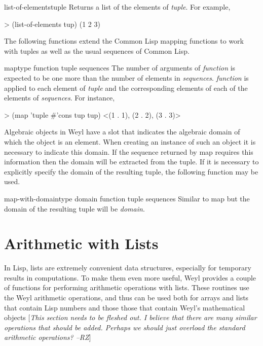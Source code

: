\begin{methoddef}{list-of-elements}{tuple}
Returns a list of the elements of {\em tuple}.  For example,
\begin{code}
> (list-of-elements tup)
(1 2 3)
\end{code}
\end{methoddef}
  
The following functions extend the Common Lisp mapping functions to
work with tuples as well as the usual sequences of Common Lisp.
  
\begin{methoddef}{map}{type function tuple \rest sequences}
The number of arguments of {\em function} is
expected to be one more than the number of elements
in {\em sequences}.  {\em function} is applied to each element of
{\em tuple} and the corresponding elements of each of the
elements of {\em sequences}. For instance,
\begin{code}
> (map 'tuple #'cons tup tup)
<(1 . 1), (2 . 2), (3 . 3)>
\end{code}
\end{methoddef}

Algebraic objects in Weyl have a slot that indicates the algebraic
domain of which the object is an element.  When creating an instance
of such an object it is necessary to indicate this domain.  If the
sequence returned by {\sf map} requires this information then the
domain will be extracted from the tuple.  If it is necessary to
explicitly specify the domain of the resulting tuple, the following
function may be used.
  
\begin{methoddef}{map-with-domain}{type domain function tuple \rest sequences}
Similar to {\sf map} but the domain of the resulting tuple will be
{\em domain}.
\end{methoddef}

\section{Arithmetic with Lists}

In Lisp, lists are extremely convenient data structures, especially
for temporary results in computations.  To make them even more
useful, Weyl provides a couple of functions for performing arithmetic
operations with lists.  These routines use the Weyl arithmetic
operations, and thus can be used both for arrays and lists that contain
Lisp numbers and those those that contain Weyl's mathematical objects
[{\em This section needs to be fleshed out.  I believe that there are
many similar operations that should be added.  Perhaps we should just
overload the standard arithmetic operations?  --RZ}] 


